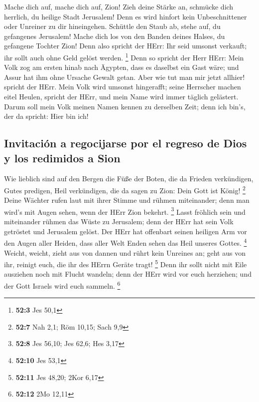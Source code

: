  Mache dich auf, mache dich auf, Zion! Zieh deine Stärke
an, schmücke dich herrlich, du heilige Stadt Jerusalem! Denn es wird
hinfort kein Unbeschnittener oder Unreiner zu dir hineingehen.
 Schüttle den Staub ab, stehe auf, du gefangenes
Jerusalem! Mache dich los von den Banden deines Halses, du gefangene
Tochter Zion!  Denn also spricht der HErr: Ihr seid
umsonst verkauft; ihr sollt auch ohne Geld gelöst werden. \footnote{\textbf{52:3}
  Jes 50,1}  Denn so spricht der Herr HErr: Mein Volk zog
am ersten hinab nach Ägypten, dass es daselbst ein Gast wäre; und Assur
hat ihm ohne Ursache Gewalt getan.  Aber wie tut man mir
jetzt allhier! spricht der HErr. Mein Volk wird umsonst hingerafft;
seine Herrscher machen eitel Heulen, spricht der HErr, und mein Name
wird immer täglich gelästert.  Darum soll mein Volk meinen
Namen kennen zu derselben Zeit; denn ich bin's, der da spricht: Hier bin
ich!

\hypertarget{invitaciuxf3n-a-regocijarse-por-el-regreso-de-dios-y-los-redimidos-a-sion}{%
\subsection{Invitación a regocijarse por el regreso de Dios y los
redimidos a
Sion}\label{invitaciuxf3n-a-regocijarse-por-el-regreso-de-dios-y-los-redimidos-a-sion}}

 Wie lieblich sind auf den Bergen die Füße der Boten, die
da Frieden verkündigen, Gutes predigen, Heil verkündigen, die da sagen
zu Zion: Dein Gott ist König! \footnote{\textbf{52:7} Nah 2,1; Röm
  10,15; Sach 9,9}  Deine Wächter rufen laut mit ihrer
Stimme und rühmen miteinander; denn man wird's mit Augen sehen, wenn der
HErr Zion bekehrt. \footnote{\textbf{52:8} Jes 56,10; Jes 62,6; Hes 3,17}
 Lasst fröhlich sein und miteinander rühmen das Wüste zu
Jerusalem; denn der HErr hat sein Volk getröstet und Jerusalem gelöst.
 Der HErr hat offenbart seinen heiligen Arm vor den Augen
aller Heiden, dass aller Welt Enden sehen das Heil unseres Gottes.
\footnote{\textbf{52:10} Jes 53,1}  Weicht, weicht, zieht
aus von dannen und rührt kein Unreines an; geht aus von ihr, reinigt
euch, die ihr des HErrn Geräte tragt! \footnote{\textbf{52:11} Jes
  48,20; 2Kor 6,17}  Denn ihr sollt nicht mit Eile
ausziehen noch mit Flucht wandeln; denn der HErr wird vor euch
herziehen; und der Gott Israels wird euch sammeln. \footnote{\textbf{52:12}
  2Mo 12,11}


